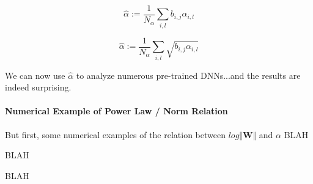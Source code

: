 
$$\hat{\alpha}:=\dfrac{1}{N_{\alpha}}\sum_{i,l}b_{i,j}\alpha_{i,l}$$


$$\hat{\alpha}:=\dfrac{1}{N_{\alpha}}\sum_{i,l}\sqrt{b_{i,j}\alpha_{i,l}}$$


We can now use $\hat{\alpha}$ to analyze numerous pre-trained DNNs...and the results are indeed surprising.

\paragraph{Numerical Example of Power Law / Norm Relation}

But first, some numerical examples of the relation between $log\Vert\mathbf{W}\Vert$ and $\alpha$
BLAH

BLAH

BLAH


